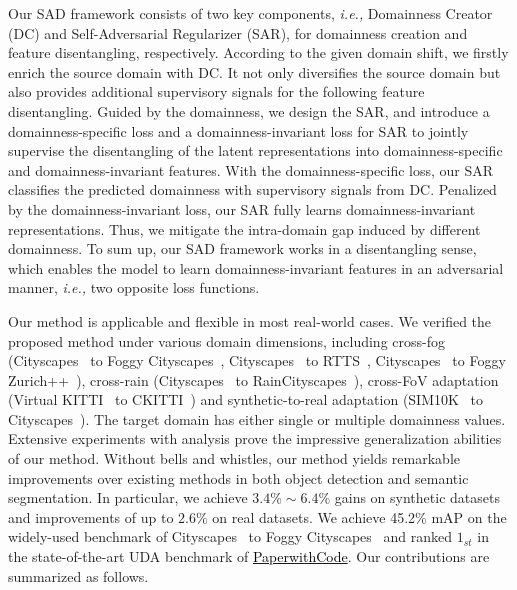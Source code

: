 \documentclass[10pt,journal,compsoc]{IEEEtran}
\begin{document}
Our SAD framework consists of two key components, \emph{i.e.,} Domainness Creator (DC) and Self-Adversarial Regularizer (SAR), for domainness creation and feature disentangling, respectively.  
According to the given domain shift, we firstly enrich the source domain with DC.
It not only diversifies the source domain  but also provides additional supervisory signals for the following feature  disentangling. 
Guided by the domainness, we design the SAR, and introduce a domainness-specific loss and a domainness-invariant loss for SAR to jointly supervise the disentangling of the latent representations into
domainness-specific and domainness-invariant features. 
With the domainness-specific loss, our SAR classifies the predicted domainness with supervisory signals from DC. Penalized by the domainness-invariant loss, our SAR fully learns domainness-invariant representations. Thus, we mitigate the intra-domain gap induced by different domainness. 
 To sum up, our SAD framework works in a disentangling sense, which enables the model to learn domainness-invariant features in an adversarial manner, \emph{i.e.,} two opposite loss functions. 


 Our method is applicable and flexible in most real-world cases. We verified the proposed method under various domain dimensions, including cross-fog (Cityscapes~\cite{cordts2016cityscapes} to Foggy Cityscapes~\cite{FoggyCity}, Cityscapes~\cite{cordts2016cityscapes} to RTTS~\cite{RTTS}, Cityscapes~\cite{cordts2016cityscapes} to Foggy Zurich++~\cite{FoggyDriving,FoggyCity}), cross-rain (Cityscapes~\cite{cordts2016cityscapes} to RainCityscapes~\cite{rainy_city}), cross-FoV adaptation (Virtual KITTI~\cite{VKITTI} to CKITTI~\cite{kITTI,cordts2016cityscapes}) and synthetic-to-real adaptation (SIM10K~\cite{sim10k} to Cityscapes~\cite{cordts2016cityscapes}). The target domain has either single or multiple domainness values.  Extensive experiments with analysis prove the impressive generalization abilities of our method.  Without bells and whistles, our method yields remarkable improvements over existing methods in both object detection and semantic segmentation. In particular, we achieve $3.4\% \sim 6.4\%$ gains on synthetic datasets and improvements of up to $2.6\%$ on real datasets.   We achieve 45.2$\%$ mAP on the widely-used benchmark of Cityscapes~\cite{cordts2016cityscapes} to Foggy Cityscapes~\cite{FoggyCity} and ranked $1_{st}$ in the state-of-the-art UDA benchmark of \href{https://paperswithcode.com/sota/unsupervised-domain-adaptation-on-cityscapes-1}{\textcolor{black}{PaperwithCode}}. Our contributions are summarized as follows. 
\end{document}
